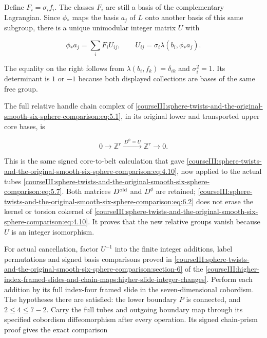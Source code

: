 \label{courseIII:sphere-twists-and-the-original-smooth-six-sphere-comparison:section-6}

Define \(F_i=\sigma_i f_i\). The classes \(F_i\) are still a basis of the complementary Lagrangian. Since \(\phi_*\) maps the basis \(a_j\) of \(L\) onto another basis of this same subgroup, there is a unique unimodular integer matrix \(U\) with

\begin{equation}
\phi_*a_j=\sum_iF_iU_{ij},\qquad
        U_{ij}=\sigma_i\lambda(b_i,\phi_*a_j).
 \label{courseIII:sphere-twists-and-the-original-smooth-six-sphere-comparison:eq:6.1}
\end{equation}

The equality on the right follows from \(\lambda(b_i,f_k)=\delta_{ik}\) and \(\sigma_i^2=1\). Its determinant is \(1\) or \(-1\) because both displayed collections are bases of the same free group.

The full relative handle chain complex of \eqref{courseIII:sphere-twists-and-the-original-smooth-six-sphere-comparison:eq:5.1}, in its original lower and transported upper core bases, is

\begin{equation}
0\longrightarrow\mathbb Z^r
                \xrightarrow{\,D^\phi=U\,}\mathbb Z^r
                       \longrightarrow0 .
 \label{courseIII:sphere-twists-and-the-original-smooth-six-sphere-comparison:eq:6.2}
\end{equation}

This is the same signed core-to-belt calculation that gave \eqref{courseIII:sphere-twists-and-the-original-smooth-six-sphere-comparison:eq:4.10}, now applied to the actual tubes \eqref{courseIII:sphere-twists-and-the-original-smooth-six-sphere-comparison:eq:5.7}. Both matrices \(D^{\rm old}\) and \(D^\phi\) are retained; \eqref{courseIII:sphere-twists-and-the-original-smooth-six-sphere-comparison:eq:6.2} does not erase the kernel or torsion cokernel of \eqref{courseIII:sphere-twists-and-the-original-smooth-six-sphere-comparison:eq:4.10}. It proves that the new relative groups vanish because \(U\) is an integer isomorphism.

For actual cancellation, factor \(U^{-1}\) into the finite integer additions, label permutations and signed basis comparisons proved in \cref{courseIII:sphere-twists-and-the-original-smooth-six-sphere-comparison:section-6} of the \cref{courseIII:higher-index-framed-slides-and-chain-maps:higher-slide-integer-changes}. Perform each addition by its full index-four framed slide in the seven-dimensional cobordism. The hypotheses there are satisfied: the lower boundary \(P\) is connected, and \(2\le4\le7-2\). Carry the full tubes and outgoing boundary map through its specified cobordism diffeomorphism after every operation. Its signed chain-prism proof gives the exact comparison

